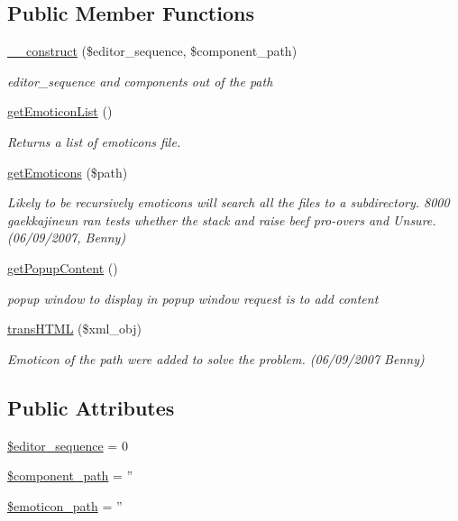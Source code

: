 \subsection*{Public Member Functions}
\begin{DoxyCompactItemize}
\item 
\hyperlink{classemoticon_aec4afa8508e94aea4418d21343f1a3b6}{\-\_\-\-\_\-construct} (\$editor\-\_\-sequence, \$component\-\_\-path)
\begin{DoxyCompactList}\small\item\em editor\-\_\-sequence and components out of the path \end{DoxyCompactList}\item 
\hyperlink{classemoticon_ac8b67c22af9daf48fb1d95f4fea2d07e}{get\-Emoticon\-List} ()
\begin{DoxyCompactList}\small\item\em Returns a list of emoticons file. \end{DoxyCompactList}\item 
\hyperlink{classemoticon_a95bdb6fcf406fc9882332a3b5f01542c}{get\-Emoticons} (\$path)
\begin{DoxyCompactList}\small\item\em Likely to be recursively emoticons will search all the files to a subdirectory. 8000 gaekkajineun ran tests whether the stack and raise beef pro-\/overs and Unsure. (06/09/2007, Benny) \end{DoxyCompactList}\item 
\hyperlink{classemoticon_afe901b31a28bed049ed8d553e996736d}{get\-Popup\-Content} ()
\begin{DoxyCompactList}\small\item\em popup window to display in popup window request is to add content \end{DoxyCompactList}\item 
\hyperlink{classemoticon_ae88c968e3b183a101c96d8013b4bf926}{trans\-H\-T\-M\-L} (\$xml\-\_\-obj)
\begin{DoxyCompactList}\small\item\em Emoticon of the path were added to solve the problem. (06/09/2007 Benny) \end{DoxyCompactList}\end{DoxyCompactItemize}
\subsection*{Public Attributes}
\begin{DoxyCompactItemize}
\item 
\hyperlink{classemoticon_ac9b927beccb93f77b8ef28b363841f38}{\$editor\-\_\-sequence} = 0
\item 
\hyperlink{classemoticon_a6553902e718eb62d7f0e1bab0406c653}{\$component\-\_\-path} = ''
\item 
\hyperlink{classemoticon_a21bb58c0d640141cc27203b584f99dd8}{\$emoticon\-\_\-path} = ''
\end{DoxyCompactItemize}


